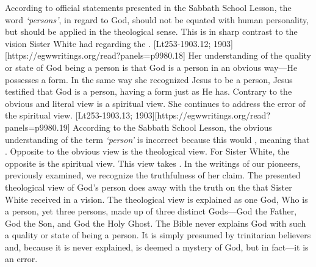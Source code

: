 According to official statements presented in the Sabbath School Lesson, the word \textit{‘persons’},\textit{ }in regard to God, should not be equated with human personality, but should be applied in the theological sense. This is in sharp contrast to the vision Sister White had regarding the . [Lt253-1903.12; 1903][https://egwwritings.org/read?panels=p9980.18] Her understanding of the quality or state of God being a person is that God is a person in an obvious way—He possesses a form. In the same way she recognized Jesus to be a person, Jesus testified that God is a person, having a form just as He has. Contrary to the obvious and literal view is a spiritual view. She continues to address the error of the spiritual view. [Lt253-1903.13; 1903][https://egwwritings.org/read?panels=p9980.19] According to the Sabbath School Lesson, the obvious understanding of the term \textit{‘person’ }is incorrect because this would , meaning that . Opposite to the obvious view is the theological view. For Sister White, the opposite is the spiritual view. This view takes . In the writings of our pioneers, previously examined, we recognize the truthfulness of her claim. The presented theological view of God’s person does away with the truth on the  that Sister White received in a vision. The theological view is explained as one God, Who is a person, yet three persons, made up of three distinct Gods—God the Father, God the Son, and God the Holy Ghost. The Bible never explains God with such a quality or state of being a person. It is simply presumed by trinitarian believers and, because it is never explained, is deemed a mystery of God, but in fact—it is an error.

